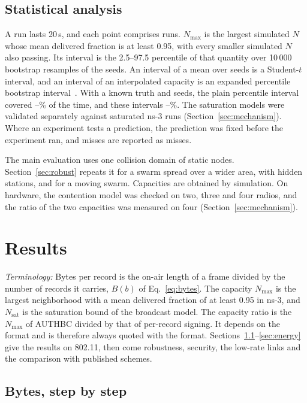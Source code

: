 \documentclass[lineno,pdflatex,sn-mathphys-num]{sn-jnl}
\newcommand{\runin}[1]{\textit{#1:}}
\renewcommand{\_}{\authbcunderscore\allowbreak}
\begin{document}
\subsection{Statistical analysis}\label{sec:stats}
A run lasts 20\,s, and each point comprises \seeds{} runs. $N_{\max}$ is the largest simulated $N$
whose mean delivered fraction is at least 0.95, with every smaller simulated $N$ also passing. Its
interval is the 2.5--97.5 percentile of that quantity over 10\,000 bootstrap resamples of the
seeds. An interval of a mean over seeds is a Student-$t$ interval, and an interval of an
interpolated capacity is an expanded percentile bootstrap
interval~\cite{hesterberg2015bootstrap}. With a known truth and \seeds{} seeds, the plain
percentile interval covered \covPlainLo--\covPlainHi\% of the time, and these intervals
\covFixedLo--\covFixedHi\%. The saturation models were validated separately against saturated
ns-3 runs (Section~\ref{sec:mechanism}). Where an experiment tests a prediction, the prediction
was fixed before the experiment ran, and misses are reported as misses.

The main evaluation uses one collision domain of static nodes. Section~\ref{sec:robust} repeats
it for a swarm spread over a wider area, with hidden stations, and for a moving swarm.
Capacities are obtained by simulation. On hardware, the contention model was checked on two,
three and four radios, and the ratio of the two capacities was measured on four
(Section~\ref{sec:mechanism}).

\section{Results}\label{sec:results}

\runin{Terminology} Bytes per record is the on-air length of a frame divided by the number of
records it carries, $B(b)$ of Eq.~\eqref{eq:bytes}. The capacity $N_{\max}$ is the largest
neighborhood with a mean delivered fraction of at least 0.95 in ns-3, and $N_{\mathrm{sat}}$ is the
saturation bound of the broadcast model. The capacity ratio is the $N_{\max}$ of AUTHBC divided by
that of per-record signing. It depends on the format and is therefore always quoted with the
format. Sections~\ref{sec:bytes}--\ref{sec:energy} give the results on 802.11, then come
robustness, security, the low-rate links and the comparison with published schemes.

\subsection{Bytes, step by step}\label{sec:bytes}
\end{document}

